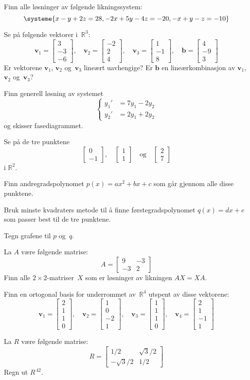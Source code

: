 \documentclass[titlepage,a4paper,12pt,norsk]{IMFeksamen}
\newcommand{\R}{\mathbb{R}}
\newcommand{\V}[1]{\mathbf{#1}}
\newcommand{\vv}[2]{\begin{bmatrix} #1 \\ #2 \end{bmatrix}}
\newcommand{\vvv}[3]{\begin{bmatrix} #1 \\ #2 \\ #3 \end{bmatrix}}
\newcommand{\vvvv}[4]{\begin{bmatrix} #1 \\ #2 \\ #3 \\ #4 \end{bmatrix}}
\renewcommand{\v}{\V{v}}
\renewcommand{\b}{\V{b}}
\newcommand{\0}{\V{0}}
\begin{document}
\begin{oppgave}
Finn alle løsninger av følgende likningssystem:
\[
\systeme{
x - y + 2z = 28,
-2x + 5y - 4z = -20,
-x + y - z = -10
}
\]
\end{oppgave}


\begin{oppgave}
Se på følgende vektorer i~$\R^3$:
\[
\v_1 = \vvv{3}{-3}{-6},\quad
\v_2 = \vvv{-2}{2}{4},\quad
\v_3 = \vvv{1}{-1}{8},\quad
\b = \vvv{4}{-9}{3}
\]
Er vektorene $\v_1$, $\v_2$ og~$\v_3$ lineært uavhengige?
Er $\b$ en lineærkombinasjon av $\v_1$, $\v_2$ og~$\v_3$?
\end{oppgave}


\begin{oppgave}
Finn generell løsning av systemet
\[
\left\{
\begin{aligned}
y_1' &= 7 y_1 - 2 y_2 \\
y_2' &= 2 y_1 + 2 y_2
\end{aligned}
\right.
\]
og skisser fasediagrammet.
\end{oppgave}


\begin{oppgave}
Se på de tre punktene
\[
\vv{0}{-1},\quad
\vv{1}{1}\quad\text{og}\quad
\vv{2}{7}
\]
i $\R^2$.

Finn andregradspolynomet
$p(x) = ax^2 + bx + c$
som går gjennom alle disse punktene.

Bruk minste kvadraters metode til å finne  førstegradspolynomet
$q(x) = dx + e$
som passer best til de tre punktene.

Tegn grafene til $p$ og~$q$.
\end{oppgave}


\begin{oppgave}
La $A$ være følgende matrise:
\[
A =
\begin{bmatrix}
 9 & -3 \\
-3 &  2
\end{bmatrix}
\]
Finn alle $2 \times 2$-matriser~$X$ som er løsninger av likningen
$AX = XA$.
\end{oppgave}


\begin{oppgave}
Finn en ortogonal basis for underrommet av~$\R^4$ utspent av
disse vektorene:
\[
\v_1 = \vvvv{2}{1}{1}{0},\quad
\v_2 = \vvvv{1}{0}{-2}{1},\quad
\v_3 = \vvvv{1}{1}{1}{0},\quad
\v_4 = \vvvv{2}{1}{-1}{1}
\]
\end{oppgave}


\begin{oppgave}
La $R$ være følgende matrise:
\[
R =
\begin{bmatrix}
        1/2 & \sqrt{3}/2 \\
-\sqrt{3}/2 &        1/2
\end{bmatrix}
\]
Regn ut $R^{\,42}$.
\end{oppgave}
\end{document}
